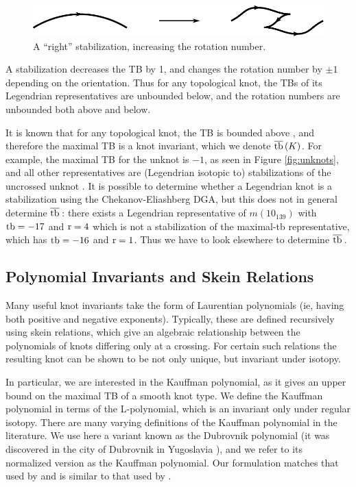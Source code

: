 \begin{figure}[ht]
    \centering
    \includegraphics[width=0.6\linewidth]{images/stabilization.pdf}
    \caption{A ``right'' stabilization, increasing the rotation number.}%
    \label{fig:stabilization}
\end{figure}

A stabilization decreases the TB by 1, and changes the rotation number by $\pm 1$ depending on the orientation. Thus for any topological knot, the TBs of its Legendrian representatives are unbounded below, and the rotation numbers are unbounded both above and below.

It is known that for any topological knot, the TB is bounded above \cite{bennequin}, and therefore the maximal TB is a knot invariant, which we denote $\overline{\operatorname{tb}}\,(K)$.
For example, the maximal TB for the unknot is $-1$, as seen in Figure \ref{fig:unknots}, and all other representatives are (Legendrian isotopic to) stabilizations of the uncrossed unknot \cite{atlas}. It is possible to determine whether a Legendrian knot is a stabilization using the Chekanov-Eliashberg DGA, but this does not in general determine $\overline{\operatorname{tb}}\,$: there exists a Legendrian representative of $m(10_{139})$ with $\operatorname{tb} = -17$ and $\operatorname{r} = 4$ which is not a stabilization of the maximal-tb representative, which has $\operatorname{tb} = -16$ and $\operatorname{r} = 1$. Thus we have to look elsewhere to determine $\overline{\operatorname{tb}}\,$.

\subsection{Polynomial Invariants and Skein Relations}

Many useful knot invariants take the form of Laurentian polynomials (ie, having both positive and negative exponents). Typically, these are defined recursively using skein relations, which give an algebraic relationship between the polynomials of knots differing only at a crossing. For certain such relations the resulting knot can be shown to be not only unique, but invariant under isotopy.

In particular, we are interested in the Kauffman polynomial, as it gives an upper bound on the maximal TB of a smooth knot type. We define the Kauffman polynomial in terms of the L-polynomial, which is an invariant only under regular isotopy.
There are many varying definitions of the Kauffman polynomial in the literature. We use here a variant known as the Dubrovnik polynomial (it was discovered in the city of Dubrovnik in Yugoslavia \cite{kauffman}), and we refer to its normalized version as the Kauffman polynomial. Our formulation matches that used by \cite{ferrand} and is similar to that used by \cite{lu-zhong}.

